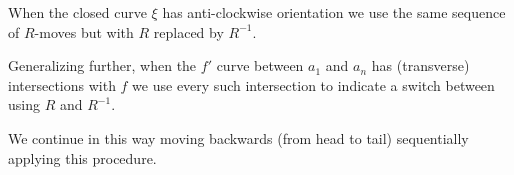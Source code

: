 When the closed curve $\xi$ has anti-clockwise orientation
we use the same sequence of $R$-moves but with $R$ replaced by $R^{-1}.$

Generalizing further,
when the $f'$ curve between $a_1$ and $a_n$ has (transverse) intersections
with $f$ we use every such intersection to indicate a switch
between using $R$ and $R^{-1}.$

We continue in this way moving backwards (from
head to tail) sequentially applying this procedure.




